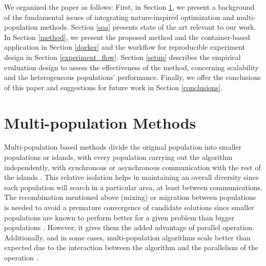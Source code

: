 \documentclass[review]{elsarticle}
\begin{document}
We organized the paper as follows: First, in Section \ref{multi}, we present a
background of the fundamental issues of integrating nature-inspired optimization
and multi-population methods. Section \ref{soa} presents state of the art relevant to
our work. In Section \ref{method}, we present the proposed method and the container-based
application in Section \ref{docker} and the workflow for reproducible experiment design in Section \ref{experiment_flow}. %
Section \ref{setup} describes the empirical evaluation design to assess the effectiveness
of the method, concerning scalability and %
the heterogeneous populations' performance.  %
Finally, we offer the conclusions of this paper and suggestions for future work in Section \ref{conclusions}.


\section{Multi-population Methods} %
\label{multi}

Multi-population based methods divide the original population into
smaller populations or islands, with every population carrying out the
algorithm independently, with synchronous or asynchronous communication with the
rest of the islands \cite{Ma2019}.%
This relative isolation helps in maintaining an overall
diversity since each population will search in a particular area, at least
between communications. The recombination mentioned above (mixing) or migration
between populations is needed to avoid a premature convergence of candidate
solutions since smaller populations are known to perform better for a given
problem than bigger populations \cite{li2016multi,wu2016differential}. %
However, it gives them the added advantage of
parallel operation. Additionally, and in some cases, multi-population algorithms
scale better than expected due to the interaction between the algorithm and the
parallelism of the operation \cite{ALBA20027}. %
\end{document}
